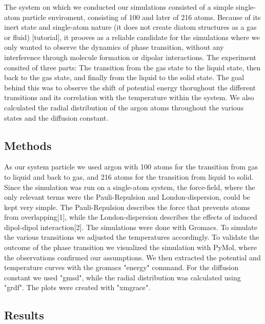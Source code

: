 \documentclass[10pt, a4paper, oneside, twocolumn]{article}
\begin{document}
The system on which we conducted our simulations consisted of a simple single-atom particle enviroment, consisting of 100 and later of 216 atoms. Because of its inert state and single-atom nature (it does not create diatom structures as a gas or fluid) [tutorial], it prooves as a reliable candidate for the simulations where we only wanted to observe the dynamics of phase
transition, without any interference through molecule formation or dipolar interactions. The experiment consited of three parts:
The transition from the gas state to the liquid state, then back to the gas state, and finally from the liquid to the solid state.
The goal behind this was to observe the shift of potential energy thorughout the different transitions and its correlation
with the temperature within the system. We also calculated the radial distribution of the argon atoms throughout the various states and the diffusion constant.

\subsection{Methods}

As our system particle we used argon with 100 atoms for the transition from gas to liquid and back to gas, and 216 atoms for the transition from liquid to solid. Since the simulation was run on a single-atom system, the force-field, where the only relevant terms were the Pauli-Repulsion and London-dispersion, could be kept very simple. The Pauli-Repulsion describes the force that prevents atoms from overlapping[1], while the London-dispersion describes the effects of induced dipol-dipol interaction[2]. The simulations were done with Gromacs. To simulate the various transitions we adjusted the temperatures accordingly. To validate
the outcome of the phase transition we visualized the simulation with PyMol, where the observations confirmed our assumptions.
We then extracted the potential and temperature curves with the gromacs "energy" command. For the diffusion constant we used "gmsd", while the radial distribution was calculated using "grdf". The plots were created with "xmgrace".



\subsection{Results}
\end{document}
